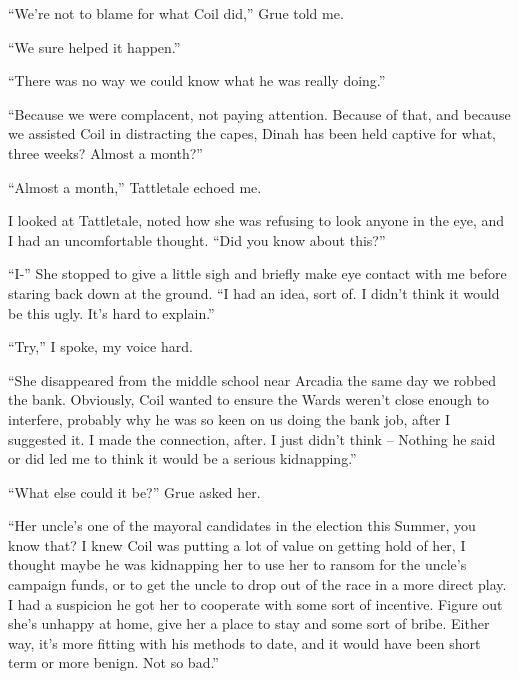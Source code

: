 





``We're not to blame for what Coil did,'' Grue told me.



``We sure helped it happen.''



``There was no way we could know what he was really doing.''



``Because we were complacent, not paying attention.  Because of that, and because we assisted Coil in distracting the capes, Dinah has been held captive for what, three weeks?  Almost a month?''



``Almost a month,'' Tattletale echoed me.



I looked at Tattletale, noted how she was refusing to look anyone in the eye, and I had an uncomfortable thought.  ``Did you know about this?''



``I-'' She stopped to give a little sigh and briefly make eye contact with me before staring back down at the ground.  ``I had an idea, sort of.  I didn't think it would be this ugly.  It's hard to explain.''



``Try,'' I spoke, my voice hard.



``She disappeared from the middle school near Arcadia the same day we robbed the bank.  Obviously, Coil wanted to ensure the Wards weren't close enough to interfere, probably why he was so keen on us doing the bank job, after I suggested it.  I made the connection, after.  I just didn't think – Nothing he said or did led me to think it would be a serious kidnapping.''



``What else could it be?'' Grue asked her.



``Her uncle's one of the mayoral candidates in the election this Summer, you know that?  I knew Coil was putting a lot of value on getting hold of her, I thought maybe he was kidnapping her to use her to ransom for the uncle's campaign funds, or to get the uncle to drop out of the race in a more direct play.  I had a suspicion he got her to cooperate with some sort of incentive.  Figure out she's unhappy at home, give her a place to stay and some sort of bribe.  Either way, it's more fitting with his methods to date, and it would have been short term or more benign.  Not so bad.''



